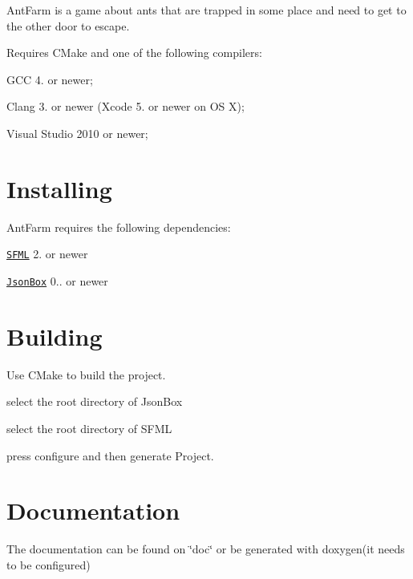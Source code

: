Ant\+Farm is a game about ants that are trapped in some place and need to get to the other door to escape.

Requires C\+Make and one of the following compilers\+:


\begin{DoxyItemize}
\item G\+C\+C 4. or newer;
\item Clang 3. or newer (Xcode 5. or newer on O\+S X);
\item Visual Studio 2010 or newer;
\end{DoxyItemize}

\section*{Installing }

Ant\+Farm requires the following dependencies\+:


\begin{DoxyItemize}
\item \href{http://sfml-dev.org}{\tt S\+F\+M\+L} 2. or newer
\item \href{https://github.com/anhero/JsonBox}{\tt Json\+Box} 0.. or newer
\end{DoxyItemize}

\section*{Building }

Use C\+Make to build the project.


\begin{DoxyItemize}
\item select the root directory of Json\+Box
\item select the root directory of S\+F\+M\+L
\item press configure and then generate Project.
\end{DoxyItemize}

\section*{Documentation }

The documentation can be found on \char`\"{}doc\char`\"{} or be generated with doxygen(it needs to be configured) 